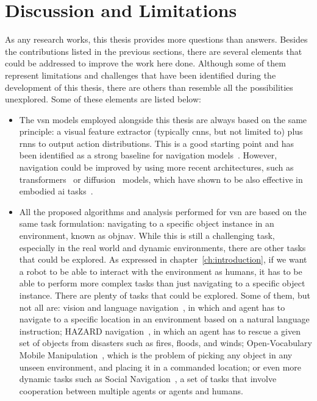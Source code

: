 \section{Discussion and Limitations}\label{sec:discussion-and-limitations}

As any research works, this thesis provides more questions than answers.
Besides the contributions listed in the previous sections, there are several elements that could be addressed to improve the work here done.
Although some of them represent limitations and challenges that have been identified during the development of this thesis, there are others than resemble all the possibilities unexplored.
Some of these elements are listed below:
\begin{itemize}
    \item The \acrshort{vsn} models employed alongside this thesis are always based on the same principle: a visual feature extractor (typically \acrshort{cnn}s, but not limited to) plus \acrshort{rnn}s to output action distributions.
    This is a good starting point and has been identified as a strong baseline for navigation models~\cite{wijmans2020}.
    However, navigation could be improved by using more recent architectures, such as transformers~\cite{Vaswani2017AttentionIA} or diffusion~\cite{pmlr-v37-sohl-dickstein15} models, which have shown to be also effective in embodied \acrshort{ai} tasks~\cite{Shah2023ViNTAF, ren2025prior}.
    \item All the proposed algorithms and analysis performed for \acrshort{vsn} are based on the same task formulation: navigating to a specific object instance in an environment, known as \acrshort{objnav}.
    While this is still a challenging task, especially in the real world and dynamic environments, there are other tasks that could be explored.
    As expressed in chapter~\ref{ch:introduction}, if we want a robot to be able to interact with the environment as humans, it has to be able to perform more complex tasks than just navigating to a specific object instance.
    There are plenty of tasks that could be explored.
    Some of them, but not all are: vision and language navigation~\cite{Anderson2017VisionandLanguageNI}, in which and agent has to navigate to a specific location in an environment based on a natural language instruction; HAZARD navigation~\cite{Zhou2024HAZARDCE}, in which an agent has to rescue a given set of objects from disasters such as fires, floods, and winds; Open-Vocabulary Mobile Manipulation~\cite{homerobotovmm, homerobotovmmchallenge2023}, which is the problem of picking any object in any unseen environment, and placing it in a commanded location; or even more dynamic tasks such as Social Navigation~\cite{puig2024habitat}, a set of tasks that involve cooperation between multiple agents or agents and humans.

\end{itemize}
